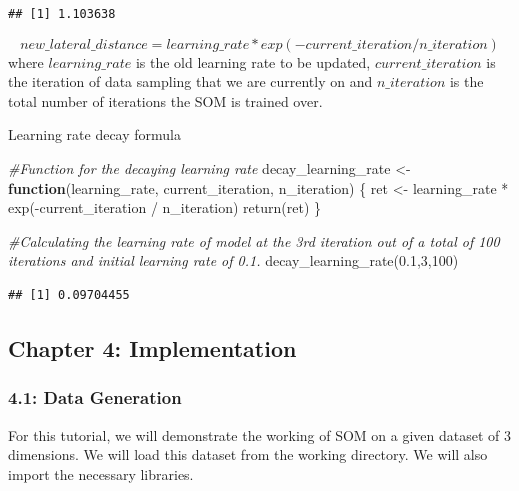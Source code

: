 \documentclass[
]{article}
\newenvironment{Shaded}{\begin{snugshade}}{\end{snugshade}}
\newcommand{\CommentTok}[1]{\textcolor[rgb]{0.56,0.35,0.01}{\textit{#1}}}
\newcommand{\ControlFlowTok}[1]{\textcolor[rgb]{0.13,0.29,0.53}{\textbf{#1}}}
\newcommand{\DecValTok}[1]{\textcolor[rgb]{0.00,0.00,0.81}{#1}}
\newcommand{\FloatTok}[1]{\textcolor[rgb]{0.00,0.00,0.81}{#1}}
\newcommand{\FunctionTok}[1]{\textcolor[rgb]{0.00,0.00,0.00}{#1}}
\newcommand{\NormalTok}[1]{#1}
\newcommand{\OtherTok}[1]{\textcolor[rgb]{0.56,0.35,0.01}{#1}}
\newcommand{\SpecialCharTok}[1]{\textcolor[rgb]{0.00,0.00,0.00}{#1}}
\begin{document}
\begin{verbatim}
## [1] 1.103638
\end{verbatim}

\begin{equation}
 new\_lateral\_distance = learning\_rate * exp(-current\_iteration / n\_iteration)
 \end{equation} where \(learning\_rate\) is the old learning rate to be
updated, \(current\_iteration\) is the iteration of data sampling that
we are currently on and \(n\_iteration\) is the total number of
iterations the SOM is trained over.

Learning rate decay formula

\begin{Shaded}
\begin{Highlighting}[]
\CommentTok{\#Function for the decaying learning rate}
\NormalTok{decay\_learning\_rate }\OtherTok{\textless{}{-}} \ControlFlowTok{function}\NormalTok{(learning\_rate, current\_iteration, n\_iteration) \{}
\NormalTok{  ret }\OtherTok{\textless{}{-}}\NormalTok{ learning\_rate }\SpecialCharTok{*} \FunctionTok{exp}\NormalTok{(}\SpecialCharTok{{-}}\NormalTok{current\_iteration }\SpecialCharTok{/}\NormalTok{ n\_iteration)}
  \FunctionTok{return}\NormalTok{(ret)}
\NormalTok{\}}

\CommentTok{\#Calculating the learning rate of model at the 3rd iteration out of a total of 100 iterations and initial learning rate of 0.1.}
\FunctionTok{decay\_learning\_rate}\NormalTok{(}\FloatTok{0.1}\NormalTok{,}\DecValTok{3}\NormalTok{,}\DecValTok{100}\NormalTok{)}
\end{Highlighting}
\end{Shaded}

\begin{verbatim}
## [1] 0.09704455
\end{verbatim}

\hypertarget{chapter-4-implementation}{%
\subsection{Chapter 4: Implementation}\label{chapter-4-implementation}}

\hypertarget{data-generation}{%
\subsubsection{4.1: Data Generation}\label{data-generation}}

For this tutorial, we will demonstrate the working of SOM on a given
dataset of 3 dimensions. We will load this dataset from the working
directory. We will also import the necessary libraries.
\end{document}

